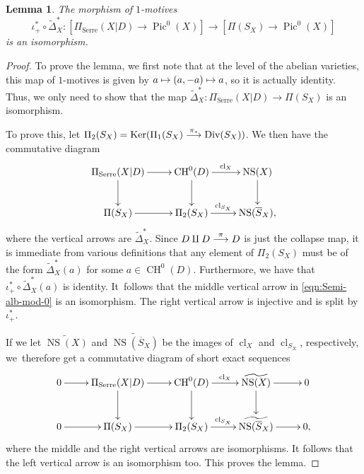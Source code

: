 \documentclass[11pt]{article}
\numberwithin{equation}{section}
\let\ra\rightarrow
\def\mto{\mathchoice{\longmapsto}{\mapsto}{\mapsto}{\mapsto}}
\def\To#1{\mathchoice{\xrightarrow{\textstyle\kern4pt#1\kern3pt}}{\stackrel{#1}{\longrightarrow}}{}{}}
\newcommand{\Serre}{\mathrm{Serre}}
\newtheorem{lem}[thm]{Lemma}
\theoremstyle{definition}
\DeclareMathOperator{\cl}{cl}
\DeclareMathOperator{\CH}{CH}
\DeclareMathOperator{\Div}{Div}
\DeclareMathOperator{\Ker}{Ker}
\DeclareMathOperator{\NS}{NS}
\DeclareMathOperator{\Pic}{Pic}
\let\ov\overline
\let\wt\widetilde
\begin{document}
\begin{lem}\label{lem:Semi-alb-mod}
The morphism of $1$-motives
\[
\iota^*_+ \circ \wt{\Delta}^*_X:[\Pi_{\Serre}(X|D) \ra \Pic^0(X)]
\to [\Pi(S_X) \ra \Pic^0(X)]
\]
is an isomorphism.
\end{lem}
\begin{proof}
To prove the lemma, we first note that at the level of the abelian varieties,
this map of $1$-motives is given by $a \mto (a, -a) \mto a$, so it is
actually identity. Thus, we only need to show that the map
$\wt{\Delta}^*_X: \Pi_{\Serre}(X|D) \to \Pi(S_X)$ is an isomorphism.

To prove this, let $\Pi_2(S_X) =
\Ker(\Pi_1(S_X) \To{\pi_*} \Div(S_X))$.
We then have the commutative diagram
\begin{equation}\label{eqn:Semi-alb-mod-0}
\begin{array}{c}
\xymatrix{
\Pi_{\Serre}(X|D) \ar[r] \ar[d] & \CH^0(D) \ar[d]
\ar[r]^-{\cl_X} & \NS(X) \ar[d] \\
\Pi(S_X) \ar[r] & \Pi_2(S_X) \ar[r]^-{\cl_{S_X}} & \NS(\ov{S}_X),}
\end{array}
\end{equation}
where the vertical arrows are $\wt{\Delta}^*_X$.
Since $D \amalg D \To{\pi} D$ is just the collapse map,
it is immediate from various definitions that any element of
$\Pi_2(S_X)$ must be of the form $\wt{\Delta}^*_X(a)$ for some
$a \in \CH^0(D)$. Furthermore, we have that
$\iota^*_+ \circ \wt{\Delta}^*_X(a)$ is identity.
It~follows that the middle vertical arrow in \eqref{eqn:Semi-alb-mod-0}
is an isomorphism. The right vertical arrow is injective and is split by
$\iota^*_+$.

If we let $\wt{\NS(X)}$ and $\wt{\NS(\ov{S}_X)}$ be
the images of ${\cl_X}$ and $\cl_{S_X}$, respectively, we~therefore get a commutative
diagram of short exact sequences
\begin{equation}\label{eqn:Semi-alb-mod-1}
\begin{array}{c}
\xymatrix{
0 \ar[r] & \Pi_{\Serre}(X|D) \ar[r] \ar[d] & \CH^0(D) \ar[d]
\ar[r]^-{\cl_X} & \wt{\NS(X)} \ar[d] \ar[r] & 0 \\
0 \ar[r] & \Pi(S_X) \ar[r] & \Pi_2(S_X) \ar[r]^-{\cl_{S_X}} &
\wt{\NS(\ov{S}_X)} \ar[r] & 0,}
\end{array}
\end{equation}
where the middle and the right vertical arrows are isomorphisms.
It follows that the left vertical arrow is an isomorphism too.
This proves the lemma.
\end{proof}
\end{document}
